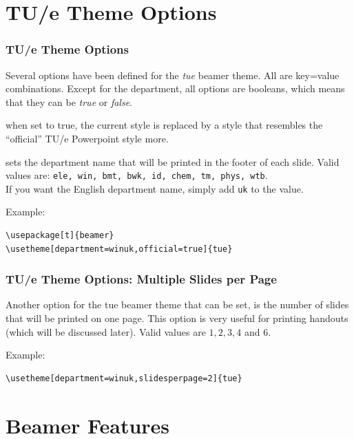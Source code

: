 \documentclass[t]{beamer}
\newenvironment{descrsf}[1]
  {\begin{list}{}{\renewcommand{\makelabel}[1]{\textsf{##1}\hfil}
                  \setlength{\itemsep}{0.5em}
                  \setlength{\parsep}{0pt}
                  \settowidth{\labelwidth}{\textsf{#1}}
                  \setlength{\labelsep}{10pt}
                  \setlength{\leftmargin}{\labelwidth}
                  \addtolength{\leftmargin}{\labelsep}
                  \providecommand{\descriptionlabel}[1]%
                      {\hspace{\labelsep}\textsf{#1}}
                 }
  }
  {\end{list}}
\begin{document}
\section{TU/e Theme Options}
\begin{frame}[fragile]
\frametitle{TU/e Theme Options}

Several options have been defined for the {\em tue} beamer theme. All are \textsf{key=value} combinations. Except for the department, all options are booleans, which means that they can be {\em true} or {\em false}.

\begin{descrsf}{department}
\item[official] when set to true, the current style is replaced by a style that resembles the ``official'' TU/e Powerpoint style more.
\item[department] sets the department name that will be printed in the footer of each slide. Valid values are:
{\tt ele, win, bmt, bwk, id, chem, tm, phys, wtb}. \\If you want the English department name, simply add {\tt uk} to the value.
\end{descrsf}

\pause
Example:

\begin{lstlisting}
\usepackage[t]{beamer}
\usetheme[department=winuk,official=true]{tue}
\end{lstlisting}
\end{frame}

\begin{frame}[fragile]
\frametitle{TU/e Theme Options: Multiple Slides per Page}

Another option for the {\sf tue} beamer theme that can be set, is the number of slides that will be printed on one page. This option is very useful for printing handouts (which will be discussed later). Valid values are $1, 2, 3, 4$ and $6$.

Example:
\begin{lstlisting}
\usetheme[department=winuk,slidesperpage=2]{tue}
\end{lstlisting}
\end{frame}


\newlength{\vsp}
\section{Beamer Features}
\end{document}
